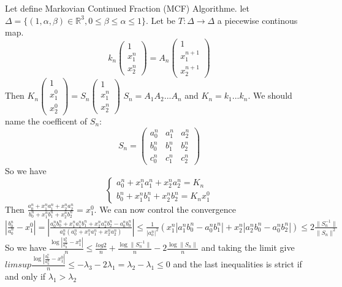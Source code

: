 \documentclass[12pt]{article}
\theoremstyle{plain}%
\theoremstyle{definition}
\theoremstyle{remark}
\begin{document}
Let define Markovian Continued Fraction (MCF) Algorithme. let $\Delta= \{ (1,\alpha,\beta) \in \mathbb{R}^3,0 \leq \beta \leq \alpha \leq 1 \}$. Let be $T : \Delta \to \Delta$ a piecewise continous map.\newline
$$ k_n
\begin{pmatrix} 1 \\ x_1^n \\ x_2^n \end{pmatrix}=
A_n \begin{pmatrix} 1 \\ x_1^{n+1} \\ x_2^{n+1} \end{pmatrix}
$$
Then $K_n \begin{pmatrix} 1 \\x_1^0 \\ x_2^0 \end{pmatrix} = S_n \begin{pmatrix} 1 \\ x_1^n \\ x_2^n \end{pmatrix}$\newline
$S_n=A_1 A_2 ... A_n$ and $K_n=k_1 ... k_n$. We should name the coefficent of $S_n$:$$
S_n=\begin{pmatrix}
a_0^n & a_1^n & a_2^n \\
b_0^n & b_1^n & b_2^n \\
c_0^n & c_1^n & c_2^n
\end{pmatrix}
$$
So we have
$$
\left \{
\begin{array}{l}
a_0^n+x_1^n a_1^n +x_2^n a_2^n=K_n\\
b_0^n+x_1^n b_1^n +x_2^n b_2^n=K_n x_1^0
\end{array}
\right .
$$
Then $\frac{a_0^n+x_1^n a_1^n +x_2^n a_2^n}{b_0^n+x_1^n b_1^n +x_2^n b_2^n}=x_1^0$.\newline
We can now control the convergence $| \frac{b_0^n}{a_0^n}-x_1^0 |= | \frac{a_0^n b_0^n+x_1^n a_1^n b_1^n +x_2^n a_2^n b_2^n-a_0^n b_0^n}{a_0^n(a_0^n+x_1^n a_1^n +x_2^n a_2^n)} | \leq \frac{1}{|a_o^n|^2}(x_1^n |a_1^n b_0^n - a_0^n b_1^n |+x_2^n |a_2^n b_0^n - a_0^n b_2^n |) \leq 2 \frac{\|S_n^{-1} \|}{\| S_n \|^2}$\newline
So we have $\frac{\log{| \frac{b_0^n}{a_0^n}-x_1^0 |}}{n} \leq \frac{log{2}}{n}+\frac{\log {\|S_n^{-1}\|}}{n}-2\frac{\log{\|S_n\|}}{n}$ and taking the limit give $limsup \frac{\log{| \frac{b_0^n}{a_0^n}-x_1^0 |}}{n} \leq -\lambda_3-2\lambda_1=\lambda_2-\lambda_1 \leq 0 $ and the last inequalities is strict if and only if $\lambda_1 > \lambda_2$
\end{document}
